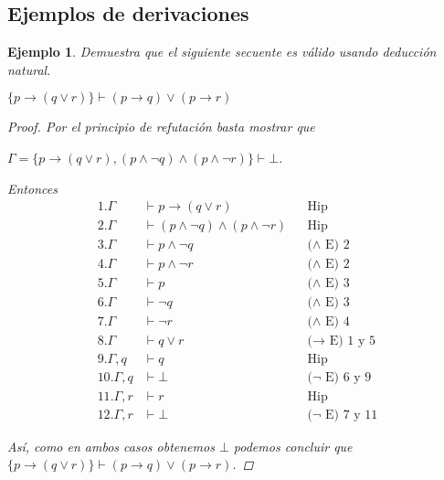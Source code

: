 \documentclass[letterpaper,12pt]{article}
\newtheorem{ejem}{Ejemplo}[]
\begin{document}
    \subsection{Ejemplos de derivaciones}
    \begin{ejem}
        Demuestra que el siguiente secuente es válido usando deducción 
        natural. 
        \begin{center}
            $\{ p \rightarrow (q \lor r) \} \vdash
            (p \rightarrow q) \lor (p \rightarrow r)$
        \end{center}
        
        \begin{proof}
            Por el principio de refutación basta mostrar que
            \begin{center}
                $\Gamma = \{ p \rightarrow (q \lor r), 
                (p \land \neg q) \land (p \land \neg r) \} \vdash \bot$.
            \end{center}
            
            \justify
            Entonces 
            \begin{align*}
                1. \Gamma &\vdash p \rightarrow (q \lor r)
                && \text{Hip} \\
                2. \Gamma &\vdash (p \land \neg q) \land (p \land \neg r)
                && \text{Hip} \\
                3. \Gamma &\vdash p \land \neg q
                && \text{($\land$ E) 2} \\
                4. \Gamma &\vdash p \land \neg r
                && \text{($\land$ E) 2} \\
                5. \Gamma &\vdash p
                && \text{($\land$ E) 3} \\
                6. \Gamma &\vdash \neg q
                && \text{($\land$ E) 3} \\
                7. \Gamma &\vdash \neg r
                && \text{($\land$ E) 4} \\
                8. \Gamma &\vdash q \lor r
                && \text{($\rightarrow$ E) 1 y 5} \\
                9. \Gamma, q &\vdash q
                && \text{Hip} \\
                10. \Gamma, q &\vdash \bot 
                && \text{($\neg$ E) 6 y 9} \\
                11. \Gamma, r &\vdash r
                && \text{Hip} \\
                12. \Gamma, r &\vdash \bot 
                && \text{($\neg$ E) 7 y 11}
            \end{align*}
            
            \justify
            Así, como en ambos casos obtenemos $\bot$ podemos concluir que 
            $\{ p \rightarrow (q \lor r) \} \vdash 
            (p \rightarrow q) \lor (p \rightarrow r)$. 

        \end{proof}
    \end{ejem}
\end{document}
